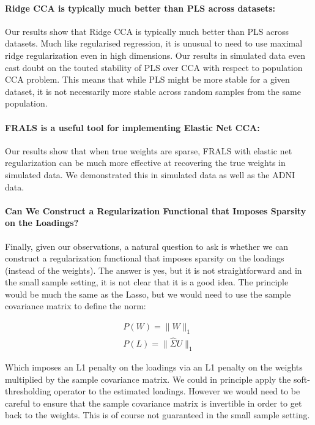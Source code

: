 \paragraph{Ridge CCA is typically much better than PLS across datasets:} Our results show that Ridge CCA is typically much better than PLS across datasets.
Much like regularised regression, it is unusual to need to use maximal ridge regularization even in high dimensions.
Our results in simulated data even cast doubt on the touted stability of PLS over CCA with respect to population CCA problem.
This means that while PLS might be more stable for a given dataset, it is not necessarily more stable across random samples from the same population.

\paragraph{FRALS is a useful tool for implementing Elastic Net CCA:} Our results show that when true weights are sparse, FRALS with elastic net regularization can be much more effective at recovering the true weights in simulated data.
We demonstrated this in simulated data as well as the ADNI data.

\paragraph{Can We Construct a Regularization Functional that Imposes Sparsity on the Loadings?}
Finally, given our observations, a natural question to ask is whether we can construct a regularization functional that imposes sparsity on the loadings (instead of the weights).
The answer is yes, but it is not straightforward and in the small sample setting, it is not clear that it is a good idea.
The principle would be much the same as the Lasso, but we would need to use the sample covariance matrix to define the norm:

\begin{align}
    P(W)=\|W\|_1 \\
    P(L)=\|\hat{\Sigma}U\|_1
\end{align}

Which imposes an L1 penalty on the loadings via an L1 penalty on the weights multiplied by the sample covariance matrix.
We could in principle apply the soft-thresholding operator to the estimated loadings.
However we would need to be careful to ensure that the sample covariance matrix is invertible in order to get back to the weights.
This is of course not guaranteed in the small sample setting.

